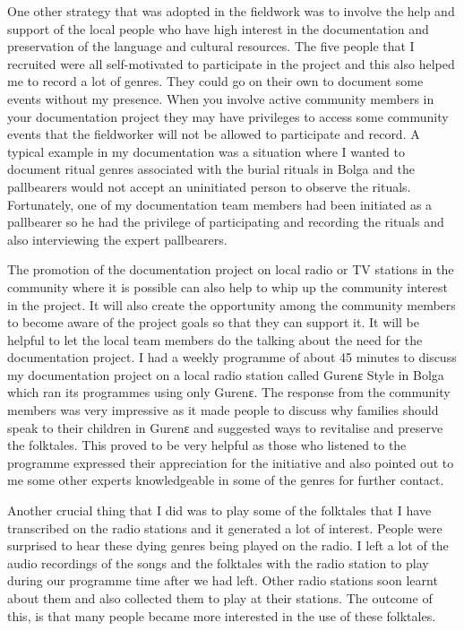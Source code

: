 \documentclass[output=paper,colorlinks,citecolor=brown]{langscibook}
\begin{document}
One other strategy that was adopted in the fieldwork was to involve the help and support of the local people who have high interest in the documentation and preservation of the language and cultural resources. The five people that I recruited were all self-motivated to participate in the project and this also helped me to record a lot of genres. They could go on their own to document some events without my presence. When you involve active community members in your documentation project they may have privileges to access some community events that the fieldworker will not be allowed to participate and record.  A typical example in my documentation was a situation where I wanted to document ritual genres associated with the burial rituals in Bolga and the pallbearers would not accept an uninitiated person to observe the rituals. Fortunately, one of my documentation team members had been initiated as a pallbearer so he had the privilege of participating and recording the rituals and also interviewing the expert pallbearers.

The promotion of the documentation project on local radio or TV stations in the community where it is possible can also help to whip up the community interest in the project. It will also create the opportunity among the community members to become aware of the project goals so that they can support it. It will be helpful to let the local team members do the talking about the need for the documentation project. I had a weekly programme of about 45 minutes to discuss my documentation project on a local radio station called Gurenɛ Style in Bolga which ran its programmes using only Gurenɛ. The response from the community members was very impressive as it made people to discuss why families should speak to their children in Gurenɛ and suggested ways to revitalise and preserve the folktales.  This proved to be very helpful as those who listened to the programme expressed their appreciation for the initiative and also pointed out to me some other experts knowledgeable in some of the genres for further contact. 

Another crucial thing that I did was to play some of the folktales that I have transcribed on the radio stations and it generated a lot of interest. People were surprised to hear these dying genres being played on the radio. I left a lot of the audio recordings of the songs and the folktales with the radio station to play during our programme time after we had left. Other radio stations soon learnt about them and also collected them to play at their stations. The outcome of this, is that many people became more interested in the use of these folktales.
\end{document}
